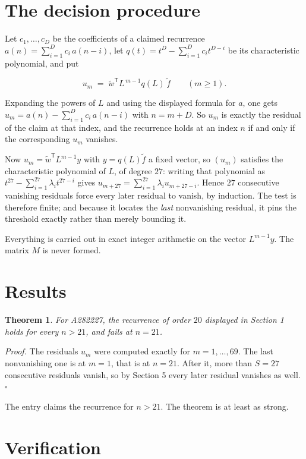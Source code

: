 \documentclass[11pt]{article}
\newtheorem{theorem}{Theorem}
\theoremstyle{definition}
\begin{document}
\section{The decision procedure}

Let $c_1,\dots,c_D$ be the coefficients of a claimed recurrence $a(n) = \sum_{i=1}^{D} c_i\,a(n-i)$, let $q(t) = t^{D} - \sum_{i=1}^{D} c_i t^{D-i}$ be its characteristic polynomial, and put

\[u_m \;=\; \tilde w^{\mathsf T} L^{\,m-1} q(L)\,\tilde f \qquad (m \ge 1).\]

Expanding the powers of $L$ and using the displayed formula for $a$, one gets $u_m = a(n) - \sum_{i=1}^{D} c_i\,a(n-i)$ with $n = m + D$. So $u_m$ is exactly the residual of the claim at that index, and the recurrence holds at an index $n$ if and only if the corresponding $u_m$ vanishes.

Now $u_m = \tilde w^{\mathsf T} L^{m-1} y$ with $y = q(L)\tilde f$ a fixed vector, so $(u_m)$ satisfies the characteristic polynomial of $L$, of degree $27$: writing that polynomial as $t^{27} - \sum_{i=1}^{27} \lambda_i t^{27-i}$ gives $u_{m+27} = \sum_{i=1}^{27} \lambda_i u_{m+27-i}$. Hence $27$ consecutive vanishing residuals force every later residual to vanish, by induction. The test is therefore finite; and because it locates the {\itshape last} nonvanishing residual, it pins the threshold exactly rather than merely bounding it.

Everything is carried out in exact integer arithmetic on the vector $L^{m-1}y$. The matrix $M$ is never formed.

\section{Results}

\begin{theorem} For A282227, the recurrence of order $20$ displayed in Section 1 holds for every $n > 21$, and fails at $n = 21$.\end{theorem}

{\itshape Proof.} The residuals $u_m$ were computed exactly for $m = 1,\dots,69$. The last nonvanishing one is at $m = 1$, that is at $n = 21$. After it, more than $S = 27$ consecutive residuals vanish, so by Section 5 every later residual vanishes as well. $\square$

The entry claims the recurrence for $n > 21$. The theorem is at least as strong.

\section{Verification}
\end{document}
